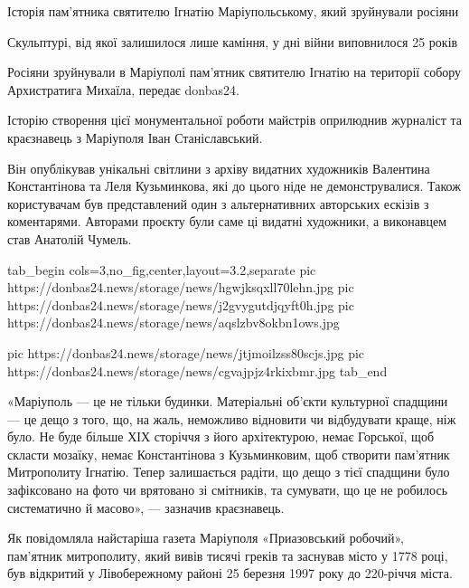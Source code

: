 \begin{center}
\begin{fminipage}{0.8\textwidth}
\em

Історія пам'ятника святителю Ігнатію Маріупольському, який зруйнували росіяни

Скульптурі, від якої залишилося лише каміння, у дні війни виповнилося 25 років

Росіяни зруйнували в Маріуполі пам'ятник святителю Ігнатію на території собору
Архистратига Михаїла, передає donbas24.

Історію створення цієї монументальної роботи майстрів оприлюднив журналіст та
краєзнавець з Маріуполя Іван Станіславський.

Він опублікував унікальні світлини з архіву видатних художників Валентина
Константінова та Леля Кузьминкова, які до цього ніде не демонструвалися. Також
користувачам був представлений один з альтернативних авторських ескізів з
коментарями. Авторами проєкту були саме ці видатні художники, а виконавцем став
Анатолій Чумель.

\begin{center}
\begin{minipage}{\textwidth}
\ifcmt
  tab_begin cols=3,no_fig,center,layout=3.2,separate
     pic https://donbas24.news/storage/news/hgwjksqxll70lehn.jpg
		 pic https://donbas24.news/storage/news/j2gvygutdjqyft0h.jpg
		 pic https://donbas24.news/storage/news/aqslzbv8okbn1ows.jpg

		 pic https://donbas24.news/storage/news/jtjmoilzss80scjs.jpg
		 pic https://donbas24.news/storage/news/cgvajpjz4rkixbmr.jpg
	tab_end
\fi
\end{minipage}
\end{center}

«Маріуполь — це не тільки будинки. Матеріальні об'єкти культурної спадщини — це
дещо з того, що, на жаль, неможливо відновити чи відбудувати краще, ніж було.
Не буде більше ХІХ сторіччя з його архітектурою, немає Горської, щоб скласти
мозаїку, немає Константінова з Кузьминковим, щоб створити пам’ятник Митрополиту
Ігнатію. Тепер залишається радіти, що дещо з тієї спадщини було зафіксовано на
фото чи врятовано зі смітників, та сумувати, що це не робилось систематично й
масово», — зазначив краєзнавець.

Як повідомляла найстаріша газета Маріуполя «Приазовський робочий», пам'ятник
митрополиту, який вивів тисячі греків та заснував місто у 1778 році, був
відкритий у Лівобережному районі 25 березня 1997 року до 220-річчя міста.


\end{fminipage}
\end{center}
